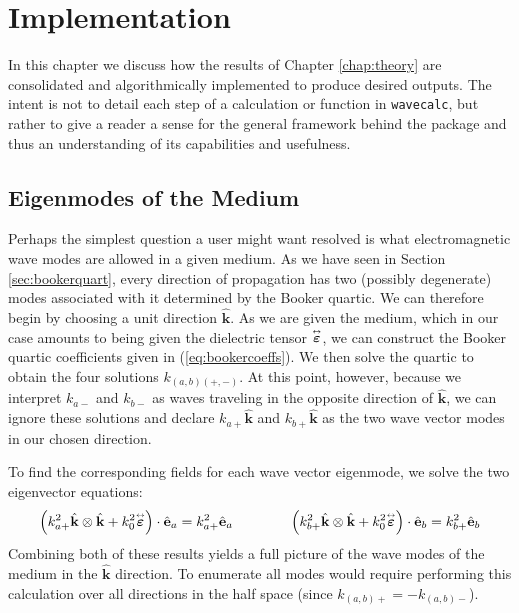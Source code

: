 \documentclass[11pt, reqno]{book}%
\newcounter{ct}
\newcommand{\es}{\begin{equation}}
\newcommand{\ef}{\end{equation} \vspace{0.05in}}
\newcommand{\mbf}{\mathbf}
\newcommand{\mbfg}[1]{\mbf{\mbox{\boldmath$#1$}}}
\newcommand{\mbfh}[1]{\hat{\mbf{#1}}}
\newcommand{\ve}{\varepsilon}
\newcommand{\tens}{\overset{\text{\tiny$\leftrightarrow$}}}
\newcommand{\tw}[1]{{\tt #1}}
\begin{document}
\chapter{Implementation}
\label{chap:implement}

In this chapter we discuss how the results of Chapter \ref{chap:theory} are consolidated and algorithmically implemented to produce desired outputs. The intent is not to detail each step of a calculation or function in \tw{wavecalc}, but rather to give a reader a sense for the general framework behind the package and thus an understanding of its capabilities and usefulness.





\section{Eigenmodes of the Medium}
\label{sec:eigenmodes}

Perhaps the simplest question a user might want resolved is what electromagnetic wave modes are allowed in a given medium. As we have seen in Section \ref{sec:bookerquart}, every direction of propagation has two (possibly degenerate) modes associated with it determined by the Booker quartic. We can therefore begin by choosing a unit direction $\mbfh{k}$. As we are given the medium, which in our case amounts to being given the dielectric tensor $\tens{\mbfg{\ve}}$, we can construct the Booker quartic coefficients given in (\ref{eq:bookercoeffs}). We then solve the quartic to obtain the four solutions $k_{(a,b)(+,-)}$. At this point, however, because we interpret $k_{a-}$ and $k_{b-}$ as waves traveling in the opposite direction of $\mbfh{k}$, we can ignore these solutions and declare $k_{a+}\mbfh{k}$ and $k_{b+}\mbfh{k}$ as the two wave vector modes in our chosen direction.

To find the corresponding fields for each wave vector eigenmode, we solve the two eigenvector equations:
\es
\left(k^2_{a+} \mbfh{k}\otimes\mbfh{k} +k^2_0 \tens{\mbfg{\ve}}   \right)\cdot \mbfh{e}_{a} = k^2_{a+} \mbfh{e}_{a} \quad\quad\quad\quad
\left(k^2_{b+} \mbfh{k}\otimes\mbfh{k} +k^2_0 \tens{\mbfg{\ve}}   \right)\cdot \mbfh{e}_{b} = k^2_{b+} \mbfh{e}_{b}
\ef
\noindent Combining both of these results yields a full picture of the wave modes of the medium in the $\mbfh{k}$ direction. To enumerate all modes would require performing this calculation over all directions in the half space (since $k_{(a,b)+}= - k_{(a,b)-}$).
\end{document}
